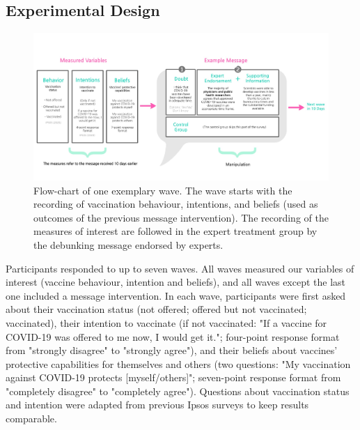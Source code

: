\documentclass[authordate, empirical]{jote-new-article}
\begin{document}
\subsection{Experimental Design}

\begin{figure}[b]
  \begin{fullwidth}
    \includegraphics[width=\linewidth]{media/image1.jpg}

    \caption{Flow-chart of one exemplary wave. The wave starts with the recording of vaccination behaviour, intentions, and beliefs (used as outcomes of the previous message intervention). The recording of the measures of interest are followed in the expert treatment group by the debunking message endorsed by experts.}

    \label{fig:rId9}

  \end{fullwidth}
\end{figure}

Participants responded to up to seven waves. All waves measured our variables of interest (vaccine behaviour, intention and beliefs), and all waves except the last one included a message intervention. In each wave, participants were first asked about their vaccination status (not offered; offered but not vaccinated; vaccinated), their intention to vaccinate (if not vaccinated: "If a vaccine for COVID-19 was offered to me now, I would get it."; four-point response format from "strongly disagree" to "strongly agree"), and their beliefs about vaccines' protective capabilities for themselves and others (two questions: "My vaccination against COVID-19 protects [myself/others]"; seven-point response format from "completely disagree" to "completely agree"). Questions about vaccination status and intention were adapted from previous Ipsos surveys \parencites{Boyon2021} to keep results comparable.
\end{document}

